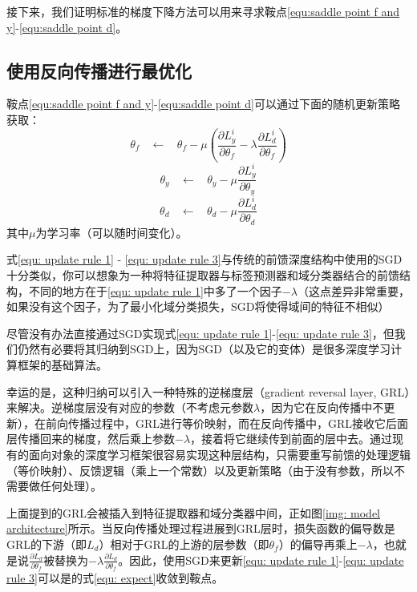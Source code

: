 \documentclass[UTF8]{ctexart}
\begin{document}
接下来，我们证明标准的梯度下降方法可以用来寻求鞍点\eqref{equ:saddle point f and y}-\eqref{equ:saddle point d}。


\subsection{使用反向传播进行最优化}
鞍点\eqref{equ:saddle point f and y}-\eqref{equ:saddle point d}可以通过下面的随机更新策略获取：
\begin{equation}
\theta_f ~~~~\leftarrow~~~~ \theta_f - \mu(\frac{\partial L_y^i}{\partial \theta_f} - \lambda\frac{\partial L_d^i}{\partial \theta_f} )
\label{equ: update rule 1}
\end{equation}
\begin{equation}
\theta_y ~~~~\leftarrow~~~~ \theta_y - \mu\frac{\partial L_y^i}{\partial \theta_y}
\label{equ: update rule 2}
\end{equation}
\begin{equation}
\theta_d ~~~~\leftarrow~~~~ \theta_d - \mu\frac{\partial L_d^i}{\partial \theta_d}
\label{equ: update rule 3}
\end{equation}
其中$\mu$为学习率（可以随时间变化）。

式\eqref{equ: update rule 1} - \eqref{equ: update rule 3}与传统的前馈深度结构中使用的SGD十分类似，你可以想象为一种将特征提取器与标签预测器和域分类器结合的前馈结构，不同的地方在于\eqref{equ: update rule 1}中多了一个因子$-\lambda$（这点差异非常重要，如果没有这个因子，为了最小化域分类损失，SGD将使得域间的特征不相似）

尽管没有办法直接通过SGD实现式\eqref{equ: update rule 1}-\eqref{equ: update rule 3}，但我们仍然有必要将其归纳到SGD上，因为SGD（以及它的变体）是很多深度学习计算框架的基础算法。

幸运的是，这种归纳可以引入一种特殊的逆梯度层（gradient reversal layer, GRL）来解决。逆梯度层没有对应的参数（不考虑元参数$\lambda$，因为它在反向传播中不更新），在前向传播过程中，GRL进行等价映射，而在反向传播中，GRL接收它后面层传播回来的梯度，然后乘上参数$-\lambda$，接着将它继续传到前面的层中去。通过现有的面向对象的深度学习框架很容易实现这种层结构，只需要重写前馈的处理逻辑（等价映射）、反馈逻辑（乘上一个常数）以及更新策略（由于没有参数，所以不需要做任何处理）。

上面提到的GRL会被插入到特征提取器和域分类器中间，正如图\ref{img: model architecture}所示。当反向传播处理过程进展到GRL层时，损失函数的偏导数是GRL的下游（即$L_d$）相对于GRL的上游的层参数（即$\theta_f$）的偏导再乘上$-\lambda$，也就是说$\frac{\partial L_d}{\partial \theta_f}$被替换为$-\lambda\frac{\partial L_d}{\partial \theta_f}$。因此，使用SGD来更新\eqref{equ: update rule 1}-\eqref{equ: update rule 3}可以是的式\ref{equ: expect}收敛到鞍点。
\end{document}
